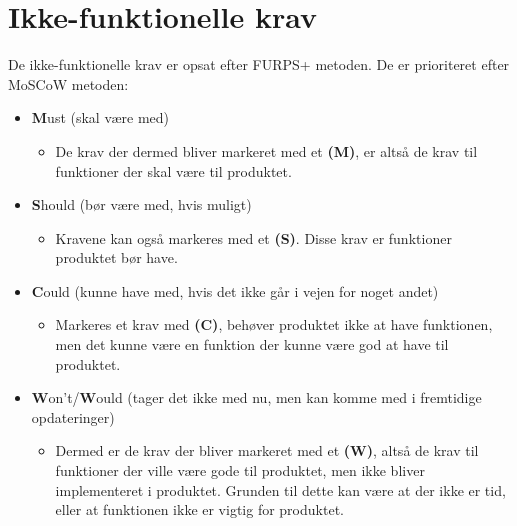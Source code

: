 \section{Ikke-funktionelle krav}
De ikke-funktionelle krav er opsat efter FURPS+ metoden. De er prioriteret efter MoSCoW metoden:
\begin{itemize}
\item \textbf{M}ust (skal være med)
\begin{itemize}
\item De krav der dermed bliver markeret med et \textbf{(M)}, er altså de krav til funktioner der skal være til produktet.
\end{itemize}
\item \textbf{S}hould (bør være med, hvis muligt)
\begin{itemize}
\item Kravene kan også markeres med et \textbf{(S)}. Disse krav er funktioner produktet bør have.
\end{itemize}
\item \textbf{C}ould (kunne have med, hvis det ikke går i vejen for noget andet)
\begin{itemize}
\item Markeres et krav med \textbf{(C)}, behøver produktet ikke at have funktionen, men det kunne være en funktion der kunne være god at have til produktet.
\end{itemize}
\item \textbf{W}on't/\textbf{W}ould (tager det ikke med nu, men kan komme med i fremtidige opdateringer)
\begin{itemize}
\item Dermed er de krav der bliver markeret med et \textbf{(W)}, altså de krav til funktioner der ville være gode til produktet, men ikke bliver implementeret i produktet. Grunden til dette kan være at der ikke er tid, eller at funktionen ikke er vigtig for produktet.
\end{itemize}
\end{itemize}

